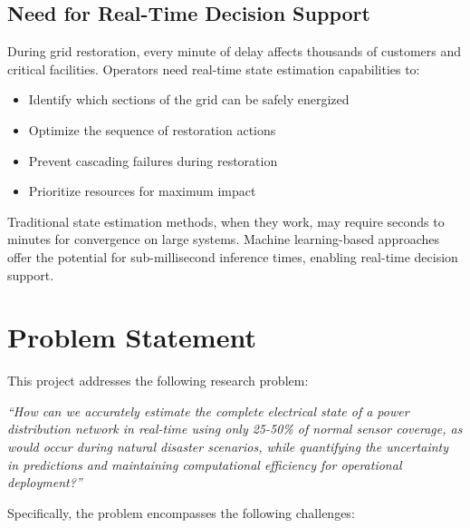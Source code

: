 \documentclass[12pt,a4paper]{report}
\begin{document}
\subsection{Need for Real-Time Decision Support}

During grid restoration, every minute of delay affects thousands of customers and critical facilities. Operators need real-time state estimation capabilities to:

\begin{itemize}
    \item Identify which sections of the grid can be safely energized
    \item Optimize the sequence of restoration actions
    \item Prevent cascading failures during restoration
    \item Prioritize resources for maximum impact
\end{itemize}

Traditional state estimation methods, when they work, may require seconds to minutes for convergence on large systems. Machine learning-based approaches offer the potential for sub-millisecond inference times, enabling real-time decision support.

\section{Problem Statement}

This project addresses the following research problem:

\textit{``How can we accurately estimate the complete electrical state of a power distribution network in real-time using only 25-50\% of normal sensor coverage, as would occur during natural disaster scenarios, while quantifying the uncertainty in predictions and maintaining computational efficiency for operational deployment?''}

Specifically, the problem encompasses the following challenges:
\end{document}
